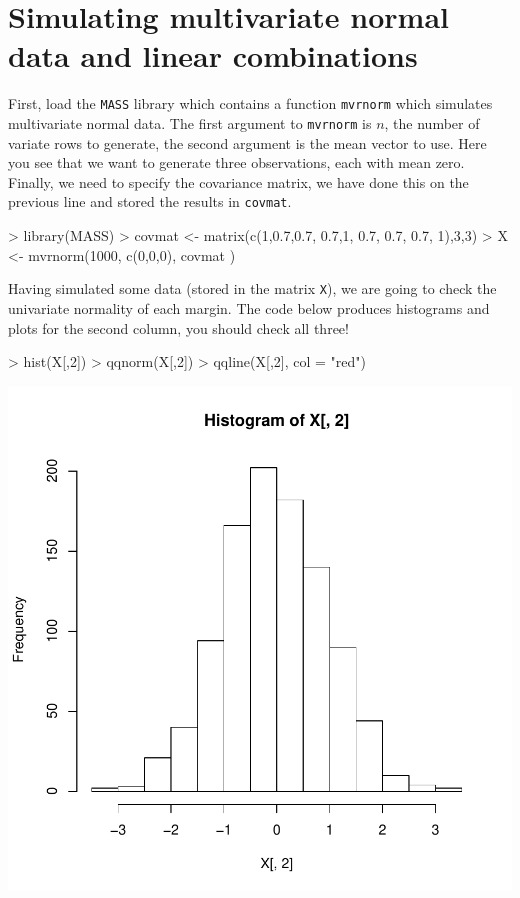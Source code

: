 \documentclass[11pt]{article}
\begin{document}
\section{Simulating multivariate normal data and linear combinations}

First, load the \texttt{MASS} library which contains a function \texttt{mvrnorm} which simulates multivariate normal data.   The first argument to \texttt{mvrnorm} is $n$, the number of variate rows to generate, the second argument is the mean vector to use.   Here you see that we want to generate three observations, each with mean zero.   Finally, we need to specify the covariance matrix, we have done this on the previous line and stored the results in \texttt{covmat}.


\begin{Schunk}
\begin{Sinput}
> library(MASS)
> covmat <- matrix(c(1,0.7,0.7, 0.7,1, 0.7, 0.7, 0.7, 1),3,3)
> X <- mvrnorm(1000, c(0,0,0), covmat )
\end{Sinput}
\end{Schunk}


Having simulated some data (stored in the matrix \texttt{X}), we are going to check the univariate normality of each margin.   The code below produces histograms and plots for the second column, you should check all three!

\begin{Schunk}
\begin{Sinput}
> hist(X[,2])
> qqnorm(X[,2])
> qqline(X[,2], col = "red")
\end{Sinput}
\end{Schunk}
\includegraphics{STAT3401Week1EDALab-uvnorm}
\end{document}
